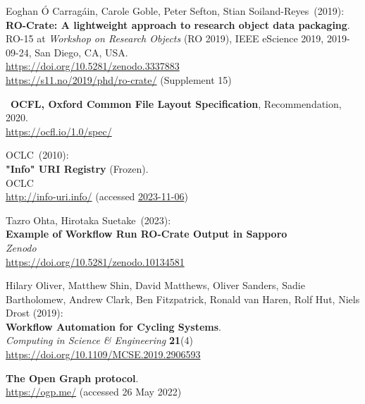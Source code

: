 \begin{thebibliography}{9}
Eoghan Ó Carragáin, Carole Goble, Peter Sefton, Stian Soiland-Reyes~(2019): \\
\textbf{RO-Crate: A lightweight approach to research object data packaging}.\\
RO-15 at \emph{Workshop on Research Objects} (RO 2019), IEEE eScience 2019, 2019-09-24, San Diego, CA, USA.\\
\url{https://doi.org/10.5281/zenodo.3337883}\\
\url{https://s11.no/2019/phd/ro-crate/}
(Supplement 15)

~\textbf{OCFL, Oxford Common File Layout Specification},
Recommendation, 2020.\\
\url{https://ocfl.io/1.0/spec/}

OCLC~(2010): \\
\textbf{"Info" {URI Registry}} ({Frozen}). \\
OCLC\\
\url{http://info-uri.info/} 
(accessed \href{https://web.archive.org/web/20231106015204/https://oclc-research.github.io/infoURI-Frozen/}{2023-11-06})

Tazro Ohta, Hirotaka Suetake~(2023): \\
\textbf{Example of Workflow Run RO-Crate Output in Sapporo}\\
\emph{Zenodo}\\
\url{https://doi.org/10.5281/zenodo.10134581}

Hilary Oliver, Matthew Shin, David Matthews, Oliver Sanders, Sadie Bartholomew, Andrew Clark, Ben Fitzpatrick, Ronald van Haren, Rolf Hut, Niels Drost (2019):\\
\textbf{Workflow Automation for Cycling Systems}.\\
\emph{Computing in Science \& Engineering} \textbf{21}(4) \\
\url{https://doi.org/10.1109/MCSE.2019.2906593}


\textbf{The {Open Graph} protocol}.  \\
\url{https://ogp.me/}
(accessed 26 May 2022)


\end{thebibliography}
